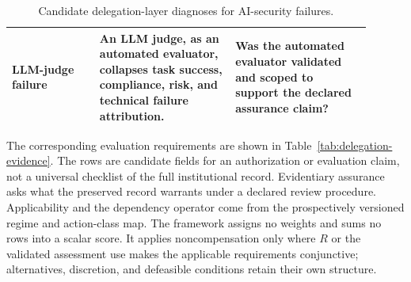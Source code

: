 \begin{table}[p]
\begin{tabular}{>{\raggedright\arraybackslash}p{0.22\linewidth}%
                >{\raggedright\arraybackslash}p{0.34\linewidth}%
                >{\raggedright\arraybackslash}p{0.34\linewidth}}
LLM-judge failure & An LLM judge, as an automated evaluator, collapses task success, compliance, risk, and technical failure attribution. & Was the automated evaluator validated and scoped to support the declared assurance claim? \\
\bottomrule
\end{tabular}
\caption{Candidate delegation-layer diagnoses for AI-security failures.}
\label{tab:delegation-failures}
\end{table}

The corresponding evaluation requirements are shown in Table~\ref{tab:delegation-evidence}. The rows are candidate fields for an authorization or evaluation claim, not a universal checklist of the full institutional record. Evidentiary assurance asks what the preserved record warrants under a declared review procedure. Applicability and the dependency operator come from the prospectively versioned regime and action-class map. The framework assigns no weights and sums no rows into a scalar score. It applies noncompensation only where \(R\) or the validated assessment use makes the applicable requirements conjunctive; alternatives, discretion, and defeasible conditions retain their own structure.

